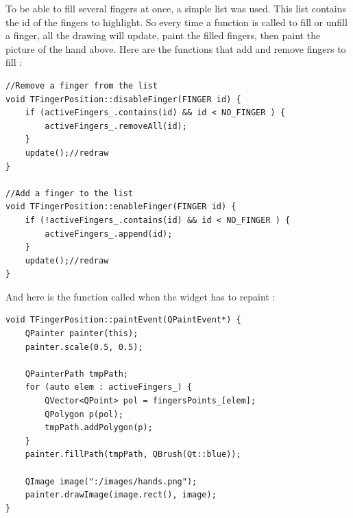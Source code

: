 To be able to fill several fingers at once, a simple list was used. This list contains the id of the fingers to highlight. So every time a function is called to fill or unfill a finger, all the drawing will update, paint the filled fingers, then paint the picture of the hand above.
Here are the functions that add and remove fingers to fill :
\begin{lstlisting}
//Remove a finger from the list
void TFingerPosition::disableFinger(FINGER id) {
    if (activeFingers_.contains(id) && id < NO_FINGER ) {
        activeFingers_.removeAll(id);
    }
    update();//redraw
}

//Add a finger to the list
void TFingerPosition::enableFinger(FINGER id) {
    if (!activeFingers_.contains(id) && id < NO_FINGER ) {
        activeFingers_.append(id);
    }
    update();//redraw
}

\end{lstlisting}

And here is the function called when the widget has to repaint :
\begin{lstlisting}
void TFingerPosition::paintEvent(QPaintEvent*) {
    QPainter painter(this);
    painter.scale(0.5, 0.5);

    QPainterPath tmpPath;
    for (auto elem : activeFingers_) {
        QVector<QPoint> pol = fingersPoints_[elem];
        QPolygon p(pol);
        tmpPath.addPolygon(p);
    }
    painter.fillPath(tmpPath, QBrush(Qt::blue));

    QImage image(":/images/hands.png");
    painter.drawImage(image.rect(), image);
}
\end{lstlisting}


